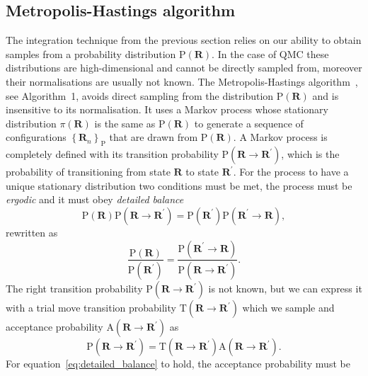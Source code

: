 \documentclass[final,3p,times,twocolumn]{elsarticle}
\begin{document}
	\subsection{Metropolis-Hastings algorithm}
		\label{subsec:Impl-MCMC}
	The integration technique from the previous section relies on our ability to obtain samples from a probability distribution $\mathrm{P}(\mathbf{R})$. In the case of QMC these distributions are high-dimensional and cannot be directly sampled from, moreover their normalisations are usually not known. 
	The Metropolis-Hastings algorithm~\cite{hastings1970monte}, see Algorithm~1, avoids direct sampling from the distribution $\mathrm{P}(\mathbf{R})$ and is insensitive to its normalisation. It uses a Markov process whose stationary distribution $\pi(\mathbf{R})$ is the same as $\mathrm{P}(\mathbf{R})$	
	to generate a sequence of configurations $\left\{\mathbf{R}_n\right\}_\mathrm{P}$ 
	that are drawn from $\mathrm{P}(\mathbf{R})$. A Markov process is completely defined with its transition probability $\mathrm{P}(\mathbf{R} \rightarrow \mathbf{R}^\prime)$, which is the probability of transitioning from state $\mathbf{R}$ to state $\mathbf{R}^\prime$. For the process to have a unique stationary distribution two conditions must be met, the process must be \emph{ergodic} and it must obey \emph{detailed balance}
	\begin{equation}
		\mathrm{P}(\mathbf{R}) \mathrm P(\mathbf{R} \rightarrow \mathbf{R}^\prime) = \mathrm{P}(\mathbf{R}^\prime) \mathrm P(\mathbf{R}^\prime \rightarrow \mathbf{R}),
	\end{equation}
	rewritten as
	\begin{equation}
		\label{eq:detailed_balance}
		\frac{\mathrm P ({\mathbf{R}})}{\mathrm P ({\mathbf{R}^\prime})} = \frac{\mathrm P(\mathbf{R}^\prime \rightarrow \mathbf{R})}{\mathrm P(\mathbf{R} \rightarrow \mathbf{R}^\prime)}.
	\end{equation}
	The right transition probability $\mathrm P(\mathbf{R} \rightarrow \mathbf{R}^\prime)$ is not known, but we can express it with a trial move transition probability $\mathrm{T}(\mathbf{R} \rightarrow \mathbf{R}^\prime)$ which we sample and acceptance probability $\mathrm{A}(\mathbf{R} \rightarrow \mathbf{R}^\prime)$ as
	\begin{equation}
		\mathrm P(\mathbf{R} \rightarrow \mathbf{R}^\prime) = \mathrm T(\mathbf{R} \rightarrow \mathbf{R}^\prime) \mathrm A(\mathbf{R} \rightarrow \mathbf{R}^\prime).
	\end{equation}
	For equation~\eqref{eq:detailed_balance} to hold, the acceptance probability must be 
\end{document}
